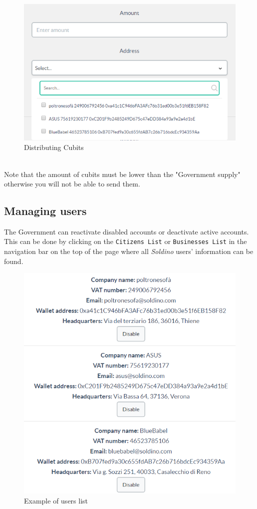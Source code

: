 		\begin{figure}[H]
			\includegraphics[width=15cm]{res/images/distributing.png}
			\centering
			\caption{Distributing Cubits}
		\end{figure} \mbox{}\\
		\noindent Note that the amount of cubits must be lower than the "Government  
		supply" otherwise you will not be able to send them.
	\subsection{Managing users}
	The Government can reactivate disabled accounts or deactivate active accounts.
	This can be done by clicking on the \texttt{Citizens List} or \texttt{Businesses List}
	in the navigation bar on the top of the page where all \textit{Soldino} users' information can be found.

	\begin{figure}[H]
		\includegraphics[width=13cm]{res/images/users_list.png}
		\centering
		\caption{Example of users list}
	\end{figure}
